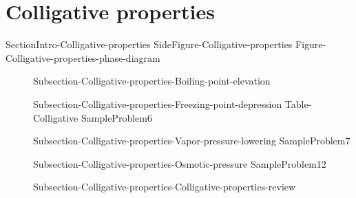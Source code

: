 \documentclass[main.tex]{subfiles}
\begin{document}
\section{Colligative properties}{SectionIntro-Colligative-properties}
{SideFigure-Colligative-properties}
{Figure-Colligative-properties-phase-diagram}
\sloppy \begin{description}
\item[] {Subsection-Colligative-properties-Boiling-point-elevation}
\item[] {Subsection-Colligative-properties-Freezing-point-depression}
{Table-Colligative}
{SampleProblem6}
\item[] {Subsection-Colligative-properties-Vapor-pressure-lowering}
{SampleProblem7}
\item[] {Subsection-Colligative-properties-Osmotic-pressure}
\vspace{0cm}\hspace{-28cm}{Figure-Osmosis}
{SampleProblem12}
\item[] {Subsection-Colligative-properties-Colligative-properties-review}
\end{description}
\end{document}
